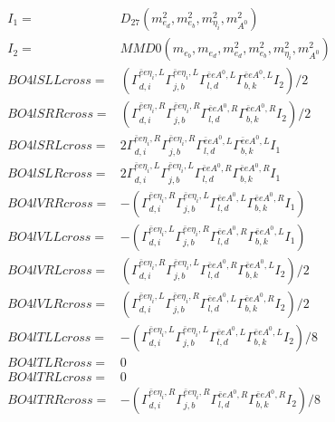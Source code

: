 \documentclass[A4,landscape]{article}
\begin{document}
\begin{align} 
I_1 = & D_{27}(m^2_{e_{{d}}}, m^2_{e_{{b}}}, m^2_{\eta_i}, m^2_{A^0}) \\ 
I_2 = & MMD0(m_{e_{{b}}}, m_{e_{{d}}}, m^2_{e_{{d}}}, m^2_{e_{{b}}}, m^2_{\eta_i}, m^2_{A^0}) \\ 
  BO4lSLLcross= & ( \Gamma^{\bar{e}e \eta_i ,L}_{d, i} \Gamma^{\bar{e}e \eta_i ,L}_{j, b} \Gamma^{\bar{e}e A^0 ,L}_{l, d} \Gamma^{\bar{e}e A^0 ,L}_{b, k} I_2)/2 \\ 
  BO4lSRRcross= & ( \Gamma^{\bar{e}e \eta_i ,R}_{d, i} \Gamma^{\bar{e}e \eta_i ,R}_{j, b} \Gamma^{\bar{e}e A^0 ,R}_{l, d} \Gamma^{\bar{e}e A^0 ,R}_{b, k} I_2)/2 \\ 
  BO4lSRLcross= & 2  \Gamma^{\bar{e}e \eta_i ,R}_{d, i} \Gamma^{\bar{e}e \eta_i ,R}_{j, b} \Gamma^{\bar{e}e A^0 ,L}_{l, d} \Gamma^{\bar{e}e A^0 ,L}_{b, k} I_1 \\ 
  BO4lSLRcross= & 2  \Gamma^{\bar{e}e \eta_i ,L}_{d, i} \Gamma^{\bar{e}e \eta_i ,L}_{j, b} \Gamma^{\bar{e}e A^0 ,R}_{l, d} \Gamma^{\bar{e}e A^0 ,R}_{b, k} I_1 \\ 
  BO4lVRRcross= & -( \Gamma^{\bar{e}e \eta_i ,R}_{d, i} \Gamma^{\bar{e}e \eta_i ,L}_{j, b} \Gamma^{\bar{e}e A^0 ,L}_{l, d} \Gamma^{\bar{e}e A^0 ,R}_{b, k} I_1) \\ 
  BO4lVLLcross= & -( \Gamma^{\bar{e}e \eta_i ,L}_{d, i} \Gamma^{\bar{e}e \eta_i ,R}_{j, b} \Gamma^{\bar{e}e A^0 ,R}_{l, d} \Gamma^{\bar{e}e A^0 ,L}_{b, k} I_1) \\ 
  BO4lVRLcross= & ( \Gamma^{\bar{e}e \eta_i ,R}_{d, i} \Gamma^{\bar{e}e \eta_i ,L}_{j, b} \Gamma^{\bar{e}e A^0 ,R}_{l, d} \Gamma^{\bar{e}e A^0 ,L}_{b, k} I_2)/2 \\ 
  BO4lVLRcross= & ( \Gamma^{\bar{e}e \eta_i ,L}_{d, i} \Gamma^{\bar{e}e \eta_i ,R}_{j, b} \Gamma^{\bar{e}e A^0 ,L}_{l, d} \Gamma^{\bar{e}e A^0 ,R}_{b, k} I_2)/2 \\ 
  BO4lTLLcross= & -( \Gamma^{\bar{e}e \eta_i ,L}_{d, i} \Gamma^{\bar{e}e \eta_i ,L}_{j, b} \Gamma^{\bar{e}e A^0 ,L}_{l, d} \Gamma^{\bar{e}e A^0 ,L}_{b, k} I_2)/8 \\ 
  BO4lTLRcross= & 0 \\ 
  BO4lTRLcross= & 0 \\ 
  BO4lTRRcross= & -( \Gamma^{\bar{e}e \eta_i ,R}_{d, i} \Gamma^{\bar{e}e \eta_i ,R}_{j, b} \Gamma^{\bar{e}e A^0 ,R}_{l, d} \Gamma^{\bar{e}e A^0 ,R}_{b, k} I_2)/8 \\ 
\end{align} 
\end{document}
